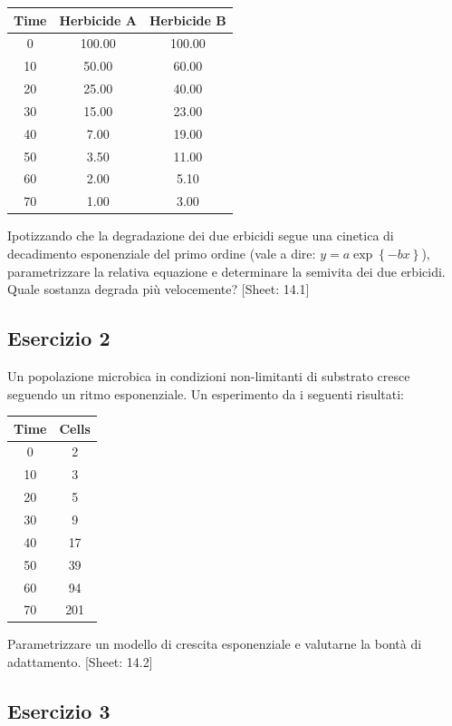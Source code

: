 \documentclass[a4paper,12pt,oneside]{book}
\begin{document}
\begin{longtable}[]{@{}ccc@{}}
\toprule()
Time & Herbicide A & Herbicide B \\
\midrule()
\endhead
0 & 100.00 & 100.00 \\
10 & 50.00 & 60.00 \\
20 & 25.00 & 40.00 \\
30 & 15.00 & 23.00 \\
40 & 7.00 & 19.00 \\
50 & 3.50 & 11.00 \\
60 & 2.00 & 5.10 \\
70 & 1.00 & 3.00 \\
\bottomrule()
\end{longtable}

Ipotizzando che la degradazione dei due erbicidi segue una cinetica di decadimento esponenziale del primo ordine (vale a dire: \(y = a \exp \left\{ - bx \right\}\)), parametrizzare la relativa equazione e determinare la semivita dei due erbicidi. Quale sostanza degrada più velocemente?
{[}Sheet: 14.1{]}

\hypertarget{esercizio-2-9}{%
\subsection{Esercizio 2}\label{esercizio-2-9}}

Un popolazione microbica in condizioni non-limitanti di substrato cresce seguendo un ritmo esponenziale. Un esperimento da i seguenti risultati:

\begin{longtable}[]{@{}cc@{}}
\toprule()
Time & Cells \\
\midrule()
\endhead
0 & 2 \\
10 & 3 \\
20 & 5 \\
30 & 9 \\
40 & 17 \\
50 & 39 \\
60 & 94 \\
70 & 201 \\
\bottomrule()
\end{longtable}

Parametrizzare un modello di crescita esponenziale e valutarne la bontà di adattamento.
{[}Sheet: 14.2{]}

\hypertarget{esercizio-3-8}{%
\subsection{Esercizio 3}\label{esercizio-3-8}}
\end{document}
